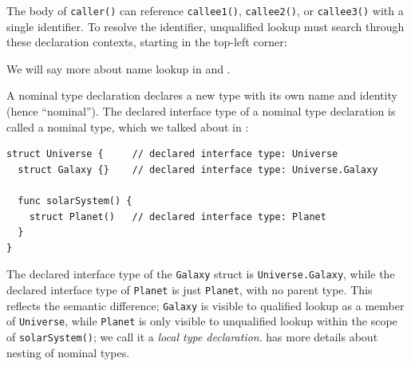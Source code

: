 \documentclass[../generics]{subfiles}
\begin{document}
The body of \texttt{caller()} can reference \texttt{callee1()}, \texttt{callee2()}, or \texttt{callee3()} with a single identifier. To resolve the identifier, unqualified lookup must search through these declaration contexts, starting in the top-left corner:
\begin{center}
\end{center}
We will say more about name lookup in  and .

A nominal type declaration declares a new type with its own name and identity (hence ``nominal''). The declared interface type of a nominal type declaration is called a nominal type, which we talked about in :
\begin{Verbatim}
struct Universe {     // declared interface type: Universe
  struct Galaxy {}    // declared interface type: Universe.Galaxy

  func solarSystem() {
    struct Planet()   // declared interface type: Planet
  }
}
\end{Verbatim}
The declared interface type of the \texttt{Galaxy} struct is \texttt{Universe.Galaxy}, while the declared interface type of \texttt{Planet} is just \texttt{Planet}, with no parent type. This reflects the semantic difference; \texttt{Galaxy} is visible to qualified lookup as a member of \texttt{Universe}, while \texttt{Planet} is only visible to unqualified lookup within the scope of \texttt{solarSystem()}; we call it a \emph{local type declaration}.  has more details about nesting of nominal types.
\end{document}

